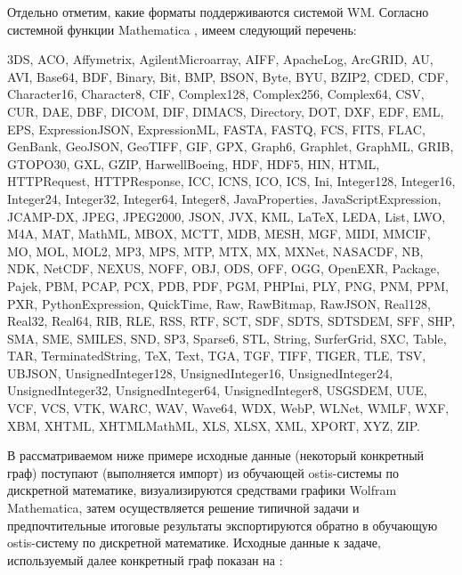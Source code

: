 Отдельно отметим, какие форматы поддерживаются системой WM. Согласно системной функции Mathematica , имеем следующий перечень: 

3DS, ACO, Affymetrix, AgilentMicroarray, AIFF, ApacheLog, ArcGRID, AU, AVI, Base64, BDF, Binary, Bit, BMP, BSON, Byte, BYU, BZIP2, CDED, CDF, Character16, Character8, CIF, Complex128, Complex256, Complex64, CSV, CUR, DAE, DBF, DICOM, DIF, DIMACS, Directory, DOT, DXF, EDF, EML, EPS, ExpressionJSON, ExpressionML, FASTA, FASTQ, FCS, FITS, FLAC, GenBank, GeoJSON, GeoTIFF, GIF, GPX, Graph6, Graphlet, GraphML, GRIB, GTOPO30, GXL, GZIP, HarwellBoeing, HDF, HDF5, HIN, HTML, HTTPRequest, HTTPResponse, ICC, ICNS, ICO, ICS, Ini, Integer128, Integer16, Integer24, Integer32, Integer64, Integer8, JavaProperties, JavaScriptExpression, JCAMP-DX, JPEG, JPEG2000, JSON, JVX, KML, LaTeX, LEDA, List, LWO, M4A, MAT, MathML, MBOX, MCTT, MDB, MESH, MGF, MIDI, MMCIF, MO, MOL, MOL2, MP3, MPS, MTP, MTX, MX, MXNet, NASACDF, NB, NDK, NetCDF, NEXUS, NOFF, OBJ, ODS, OFF, OGG, OpenEXR, Package, Pajek, PBM, PCAP, PCX, PDB, PDF, PGM, PHPIni, PLY, PNG, PNM, PPM, PXR, PythonExpression, QuickTime, Raw, RawBitmap, RawJSON, Real128, Real32, Real64, RIB, RLE, RSS, RTF, SCT, SDF, SDTS, SDTSDEM, SFF, SHP, SMA, SME, SMILES, SND, SP3, Sparse6, STL, String, SurferGrid, SXC, Table, TAR, TerminatedString, TeX, Text, TGA, TGF, TIFF, TIGER, TLE, TSV, UBJSON, UnsignedInteger128, UnsignedInteger16, UnsignedInteger24, UnsignedInteger32, UnsignedInteger64, UnsignedInteger8, USGSDEM, UUE, VCF, VCS, VTK, WARC, WAV, Wave64, WDX, WebP, WLNet, WMLF, WXF, XBM, XHTML, XHTMLMathML, XLS, XLSX, XML, XPORT, XYZ, ZIP.

В рассматриваемом ниже примере исходные данные (некоторый конкретный граф) поступают (выполняется импорт) из обучающей ostis-системы по дискретной математике, визуализируются средствами графики Wolfram Mathematica, затем осуществляется решение типичной задачи и предпочтительные итоговые результаты экспортируются обратно в обучающую ostis-систему по дискретной математике. Исходные данные к задаче, используемый далее конкретный граф показан на \textit{}:


